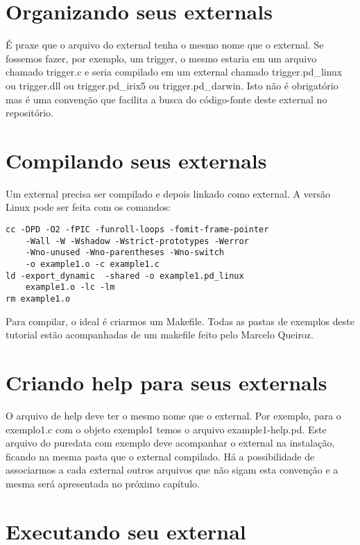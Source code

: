 \section{Organizando seus externals}

É praxe que o arquivo do external tenha o mesmo nome que o external. Se
fossemos fazer, por exemplo, um trigger, o mesmo estaria em um arquivo chamado
trigger.c e seria compilado em um external chamado trigger.pd\_linux ou
trigger.dll ou trigger.pd\_irix5 ou trigger.pd\_darwin. Isto não é obrigatório
mas é uma convenção que facilita a busca do código-fonte deste external no
repositório.

\section{Compilando seus externals}

Um external precisa ser compilado e depois linkado como external. A versão
Linux pode ser feita com os comandos:

\begin{lstlisting}
cc -DPD -O2 -fPIC -funroll-loops -fomit-frame-pointer 
	-Wall -W -Wshadow -Wstrict-prototypes -Werror 
	-Wno-unused -Wno-parentheses -Wno-switch 
	-o example1.o -c example1.c
ld -export_dynamic  -shared -o example1.pd_linux 
	example1.o -lc -lm
rm example1.o
\end{lstlisting}

Para compilar, o ideal é criarmos um Makefile. Todas as pastas de exemplos
deste tutorial estão acompanhadas de um makefile feito pelo Marcelo Queiroz.

\section{Criando help para seus externals}

O arquivo de help deve ter o mesmo nome que o external. Por exemplo, para o
exemplo1.c com o objeto exemplo1 temos o arquivo example1-help.pd. Este
arquivo do puredata com exemplo deve acompanhar o external na instalação,
ficando na mesma pasta que o external compilado.  Há a possibilidade de
associarmos a cada external outros arquivos que não sigam esta convenção e a
mesma será apresentada no próximo capítulo.

\section{Executando seu external}

